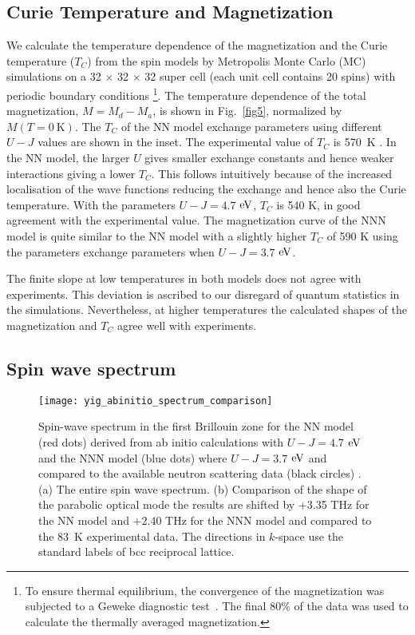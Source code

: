 \documentclass[aps,pre,reprint,superscriptaddress,longbibliography]{revtex4-1}
\begin{document}
{\subsection{Curie Temperature and Magnetization}
We calculate the temperature dependence of the magnetization and the Curie temperature ($T_C$) from the spin models by Metropolis Monte Carlo (MC) simulations on a 32 $\times$ 32 $\times$ 32 super cell (each unit cell contains 20 spins) with periodic boundary conditions \footnote{To ensure thermal equilibrium, the convergence of the magnetization was subjected to a Geweke diagnostic test~\cite{Geweke1991}. The final $80\%$ of the data was  used to calculate the thermally averaged magnetization.}. The temperature dependence of the total magnetization, $M = M_{d} - M_{a}$, is shown in Fig.~\ref{fig5}, normalized by $M(T=0~\mathrm{K})$. The $T_C$ of the NN model exchange parameters using different $U - J$ values are shown in the inset. The experimental value of $T_C$ is 570~K \cite{Anderson1964,Nimbore2006}. In the NN model, the larger $U$ gives smaller exchange constants and hence weaker interactions giving a lower $T_C$. This follows intuitively because of the increased localisation of the wave functions reducing the exchange and hence also the Curie temperature. With the parameters $U-J=4.7$ ${\rm eV}$, $T_C$ is 540 K, in good agreement with the experimental value. The magnetization curve of the NNN model is quite similar to the NN model with a slightly higher $T_C$ of 590 K using the parameters exchange parameters when $U-J=3.7$ ${\rm eV}$.} The finite slope at low temperatures in both models does not agree with experiments. This deviation is ascribed to our disregard of quantum statistics in the simulations. Nevertheless, at higher temperatures the calculated shapes of the magnetization and  $T_C$  agree well with experiments.

\subsection{Spin wave spectrum}

\begin{figure}
	\texttt{[image: yig\_abinitio\_spectrum\_comparison]}
	
	\caption{Spin-wave spectrum in the first Brillouin zone for the NN model (red dots) derived from ab initio calculations with $U-J=4.7$ ${\rm eV}$ and the NNN model (blue dots) where $U-J=3.7$ ${\rm eV}$ and compared to the available neutron scattering data (black circles) \cite{Plant1977}. (a) The entire spin wave spectrum. (b) Comparison of the shape of the parabolic optical mode the results are  shifted by +3.35 THz for the NN model and +2.40 THz for the NNN model and compared to the 83~K experimental data. The directions in $k$-space use the standard labels of bcc reciprocal lattice.\label{fig4}}
\end{figure}
\end{document}
